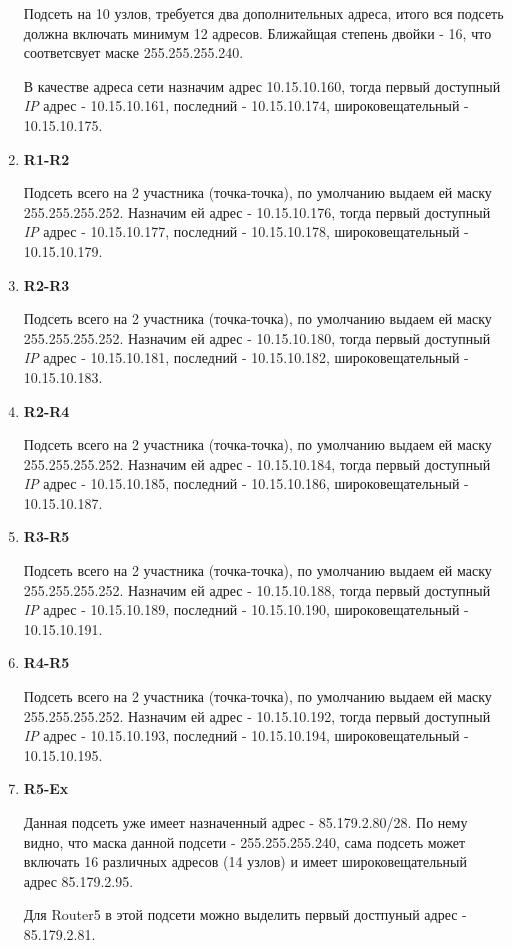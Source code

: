 \documentclass[a4paper]{article}
\begin{document}
\begin{enumerate}
{      Подсеть на 10 узлов, требуется два дополнительных адреса, итого вся подсеть
      должна включать минимум 12 адресов. Ближайщая степень двойки - 16, что соответсвует
      маске 255.255.255.240.

      В качестве адреса сети назначим адрес 10.15.10.160, тогда первый доступный \textit{IP} адрес - 10.15.10.161,
      последний - 10.15.10.174, широковещательный - 10.15.10.175.
    }
    \item {
      \textbf{R1-R2}

      Подсеть всего на 2 участника (точка-точка), по умолчанию выдаем ей маску 255.255.255.252.
      Назначим ей адрес - 10.15.10.176, тогда первый доступный \textit{IP} адрес - 10.15.10.177, последний -
      10.15.10.178, широковещательный - 10.15.10.179.
    }
    \item {
      \textbf{R2-R3}

      Подсеть всего на 2 участника (точка-точка), по умолчанию выдаем ей маску 255.255.255.252.
      Назначим ей адрес - 10.15.10.180, тогда первый доступный \textit{IP} адрес - 10.15.10.181, последний -
      10.15.10.182, широковещательный - 10.15.10.183.
    }
    \item {
      \textbf{R2-R4}

      Подсеть всего на 2 участника (точка-точка), по умолчанию выдаем ей маску 255.255.255.252.
      Назначим ей адрес - 10.15.10.184, тогда первый доступный \textit{IP} адрес - 10.15.10.185, последний -
      10.15.10.186, широковещательный - 10.15.10.187.
    }
    \item {
      \textbf{R3-R5}

      Подсеть всего на 2 участника (точка-точка), по умолчанию выдаем ей маску 255.255.255.252.
      Назначим ей адрес - 10.15.10.188, тогда первый доступный \textit{IP} адрес - 10.15.10.189, последний -
      10.15.10.190, широковещательный - 10.15.10.191.
    }
    \item {
      \textbf{R4-R5}

      Подсеть всего на 2 участника (точка-точка), по умолчанию выдаем ей маску 255.255.255.252.
      Назначим ей адрес - 10.15.10.192, тогда первый доступный \textit{IP} адрес - 10.15.10.193, последний -
      10.15.10.194, широковещательный - 10.15.10.195.
    }
    \item {
      \textbf{R5-Ex}

      Данная подсеть уже имеет назначенный адрес - 85.179.2.80/28. По нему видно,
      что маска данной подсети - 255.255.255.240, сама подсеть может включать 16 различных
      адресов (14 узлов) и имеет широковещательный адрес 85.179.2.95.

      Для Router5 в этой подсети можно выделить первый достпуный адрес - 85.179.2.81.
    }
  \end{enumerate}
\end{document}

